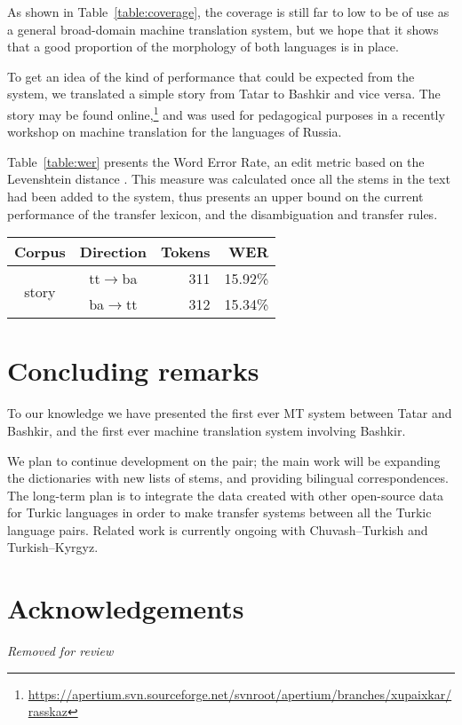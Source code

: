 \documentclass[11pt,a4paper]{article}
\begin{document}
As shown in Table~\ref{table:coverage}, the coverage is still far to low to be of use as a 
general broad-domain machine translation
system, but we hope that it shows that a good proportion of the morphology of both languages
is in place.

To get an idea of the kind of performance that could be expected from the system, we 
translated a simple story from Tatar to Bashkir and vice versa. The story may be found 
online,\footnote{\url{https://apertium.svn.sourceforge.net/svnroot/apertium/branches/xupaixkar/rasskaz}}
and was used for pedagogical purposes in a recently workshop on machine translation
for the languages of Russia.

Table~\ref{table:wer} presents the Word Error Rate, an edit metric based on the Levenshtein 
distance \cite{levenshtein/1966}. This measure was calculated once all the stems in the 
text had been added to the system, thus presents an upper bound on the current performance
of the transfer lexicon, and the disambiguation and transfer rules.

\begin{table*}
  \begin{center}
  \begin{tabular}{c|c|r|r}
   Corpus                 & Direction         & Tokens  & WER  \\
  \hline
   \multirow{2}{*}{story} & tt$\rightarrow$ba & 311     & 15.92\% \\
                          & ba$\rightarrow$tt & 312     & 15.34\%  \\
  \hline
  \end{tabular}
    \caption{Word error rate and over the small test corpus.}
    \label{table:wer}
  \end{center}
\end{table*}


\section{Concluding remarks}
\label{sec:conc}

To our knowledge we have presented the first ever MT system between Tatar and Bashkir, and the first ever machine translation system involving Bashkir.

We plan to continue development on the pair; the main work will be expanding the dictionaries with new lists of stems, and providing bilingual correspondences. The long-term plan is to integrate the data created with other open-source data for Turkic languages in order to make transfer systems between all the Turkic language pairs.  Related work is currently ongoing with Chuvash--Turkish and Turkish--Kyrgyz.


\section*{Acknowledgements}

{\em Removed for review}



\end{document}
